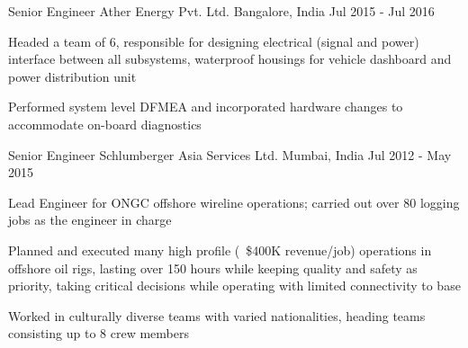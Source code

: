 \begin{cventries}
  \cventry
    {Senior Engineer} %
    {Ather Energy Pvt. Ltd.} %
    {Bangalore, India} %
    {Jul 2015 - Jul 2016} %
    {
      \begin{cvitems} %
        \item{Headed a team of 6, responsible for designing electrical (signal and power) interface between all subsystems, waterproof housings for vehicle dashboard and power distribution unit}
        \item {Performed system level DFMEA and incorporated hardware changes to accommodate on-board diagnostics}
      \end{cvitems}
    }

  \cventry
	{Senior Engineer} %
	{Schlumberger Asia Services Ltd.} %
	{Mumbai, India} %
	{Jul 2012 - May 2015} %
	{
		\begin{cvitems} %
			\item{Lead Engineer for ONGC offshore wireline operations; carried out over 80 logging jobs as the engineer in charge}
			\item {Planned and executed many high profile (~\$400K revenue/job) operations in offshore oil rigs, lasting over 150 hours while keeping quality and safety as priority, taking critical decisions while operating with limited connectivity to base}
			\item {Worked in culturally diverse teams with varied nationalities, heading teams consisting up to 8 crew members}
		\end{cvitems}
	}
\vspace{-4mm}

\end{cventries}
